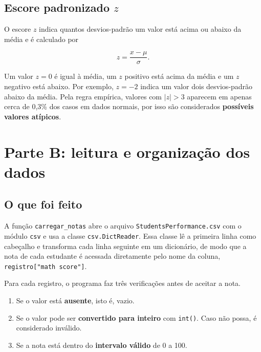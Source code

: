 \documentclass[12pt,a4paper]{article}
\begin{document}
\subsection{Escore padronizado \texorpdfstring{$z$}{z}}

O escore $z$ indica quantos desvios-padrão um valor está acima ou abaixo da média e é calculado por

\begin{equation}\label{eq:z}
  z = \frac{x - \mu}{\sigma} .
\end{equation}

Um valor $z=0$ é igual à média, um $z$ positivo está acima da média e um $z$ negativo está abaixo. Por exemplo, $z = -2$ indica um valor dois desvios-padrão abaixo da média. Pela regra empírica, valores com $|z|>3$ aparecem em apenas cerca de 0,3\% dos casos em dados normais, por isso são considerados \textbf{possíveis valores atípicos}.

\section{Parte B: leitura e organização dos dados}\label{sec:b}

\subsection{O que foi feito}

A função \texttt{carregar\_notas} abre o arquivo \texttt{StudentsPerformance.csv} com o módulo \texttt{csv} e usa a classe \texttt{csv.DictReader}. Essa classe lê a primeira linha como cabeçalho e transforma cada linha seguinte em um dicionário, de modo que a nota de cada estudante é acessada diretamente pelo nome da coluna, \texttt{registro["math score"]}.

Para cada registro, o programa faz três verificações antes de aceitar a nota.

\begin{enumerate}[leftmargin=*]
  \item Se o valor está \textbf{ausente}, isto é, vazio.
  \item Se o valor pode ser \textbf{convertido para inteiro} com \texttt{int()}. Caso não possa, é considerado inválido.
  \item Se a nota está dentro do \textbf{intervalo válido} de 0 a 100.
\end{enumerate}
\end{document}
